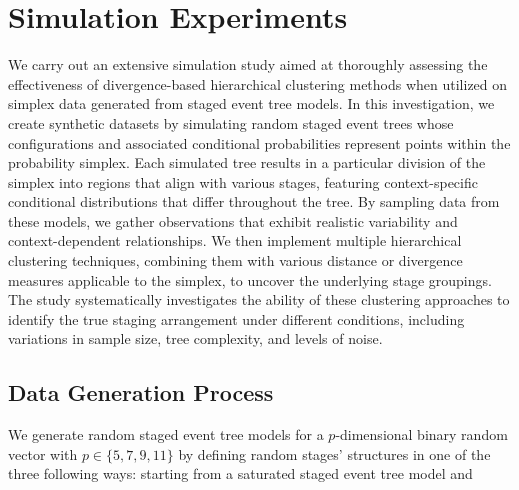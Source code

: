 \documentclass[preprint,12pt]{elsarticle}
\begin{document}

\section{Simulation Experiments}
\label{sec:simulation}


We carry out an extensive simulation study aimed at thoroughly assessing the effectiveness of divergence-based hierarchical clustering methods when utilized on simplex data generated from staged event tree models. In this investigation, we create synthetic datasets by simulating random staged event trees whose configurations and associated conditional probabilities represent points within the probability simplex. Each simulated tree results in a particular division of the simplex into regions that align with various stages, featuring context-specific conditional distributions that differ throughout the tree. By sampling data from these models, we gather  observations that exhibit realistic variability and context-dependent relationships. We then implement multiple hierarchical clustering techniques, combining them with various distance or divergence measures applicable to the simplex, to uncover the underlying stage groupings. The study systematically investigates the ability of these clustering approaches to identify the true staging arrangement under different conditions, including variations in sample size, tree complexity, and levels of noise. 


\subsection{Data Generation Process}\label{sec:syntheticmodelsdatasets}

We generate random staged event tree models  for a $p$-dimensional binary random vector with 
\( p \in \{5, 7, 9, 11\} \)
by defining random stages' structures in one 
of the three following ways: starting from a  saturated staged event tree model and
\end{document}
